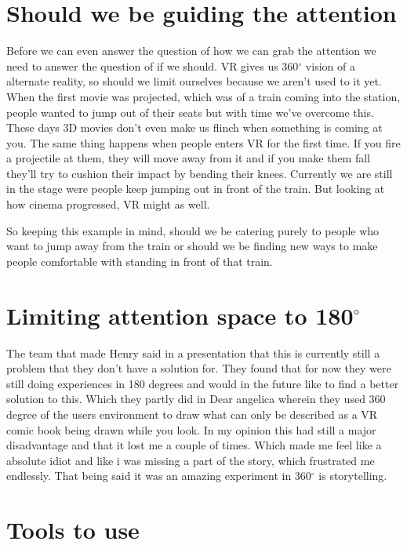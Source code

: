 \documentclass{report}
\begin{document}
				\section{Should we be guiding the attention}
				Before we can even answer the question of how we can grab the attention we need to answer the question of if we should. VR gives us 360$^{\circ}$ vision of a alternate reality, so should we limit ourselves because we aren't used to it yet. When the first movie was projected, which was of a train coming into the station, people wanted to jump out of their seats  but with time we've overcome this. These days 3D movies don't even make us flinch when something is coming at you. The same thing happens when people enters VR for the first time. If you fire a projectile at them, they will move away from it and if you make them fall they'll try to cushion their impact by bending their knees. Currently we are still in the stage were people keep jumping out in front of the train. But looking at how cinema progressed, VR might as well. 
				
				So keeping this example in mind, should we be catering purely to people who want to jump away from the train or should we be finding new ways to make people comfortable with standing in front of that train.
				
				\section{Limiting attention space to 180$^{\circ}$}
				 The team that made Henry said in a presentation that this is currently still a problem that they don't have a solution for. They found that for now they were still doing experiences in 180 degrees and would in the future like to find a better solution to this. Which they partly did in Dear angelica wherein they used 360 degree of the users environment to draw what can only be described as a VR comic book being drawn while you look. In my opinion this had still a major disadvantage and that it lost me a couple of times. Which made me feel like a absolute idiot and like i was missing a part of the story, which frustrated me endlessly. That being said it was an amazing experiment in 360$^{\circ}$ is storytelling.
				
				\section{Tools to use}
			
\end{document}
